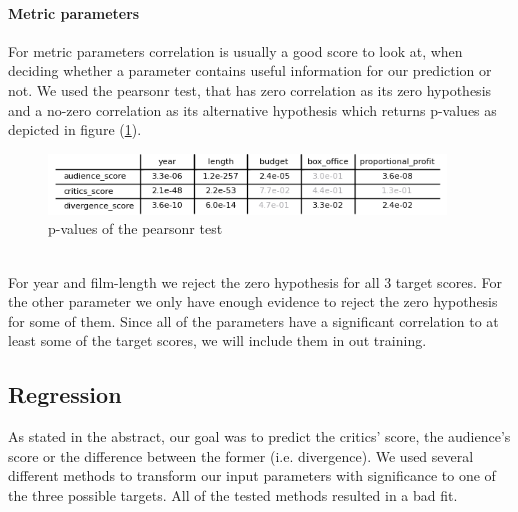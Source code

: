 \documentclass{article}
\begin{document}
    \paragraph{Metric parameters}
    For metric parameters correlation is usually a good score to look at, when deciding whether a parameter contains useful information for our prediction or not. We used the pearsonr test, that has zero correlation as its zero hypothesis and a no-zero correlation as its alternative hypothesis which returns p-values as depicted in figure (\ref{fig:hypo_rejection}).\\
    \noindent
    \begin{figure}[t]
        \centering
        \includegraphics[width=0.94\textwidth]{imgs/metric_p.png}
        \caption{p-values of the pearsonr test}
        \label{fig:hypo_rejection}
    \end{figure}\\
    For year and film-length we reject the zero hypothesis for all 3 target scores. For the other parameter we only have enough evidence to reject the zero hypothesis for some of them. Since all of the parameters have a significant correlation to at least some of the target scores, we will include them in out training.
    
    
\subsection{Regression}
    As stated in the abstract, our goal was to predict the critics' score, the audience's score or the difference between the former (i.e. divergence).
    We used several different methods to transform our input parameters with significance to one of the three possible targets. All of the tested methods resulted in a bad fit.
\end{document}
